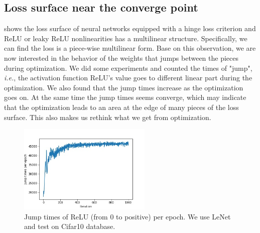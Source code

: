 \documentclass{article}
\theoremstyle{plain}
\theoremstyle{definition}
\begin{document}
\subsection{Loss surface near the converge point}
\cite{DBLP:journals/corr/abs-1712-10132} shows the loss surface of neural networks equipped with a hinge loss criterion and ReLU or leaky ReLU nonlinearities has a multilinear structure. Specifically, we can find the loss is a piece-wise multilinear form. Base on this observation, we are now interested in the behavior of the weights that jumps between the pieces during optimization.
We did some experiments and counted the times of "jump", \emph{i.e.}, the activation function ReLU's value goes to different linear part during the optimization. We also found that the jump times increase as the optimization goes on. At the same time the jump times seems converge, which may indicate that the optimization leads to an area at the edge of many pieces of the loss surface. This also makes us rethink what we get from optimization.

\begin{figure}[H]
	\centering
	\includegraphics[width=2.5in]{PieceJump.jpg}
	\caption{Jump times of ReLU (from $0$ to positive) per epoch. We use LeNet and test on Cifar10 database.}
	\label{piecejump}
\end{figure}



\end{document}
